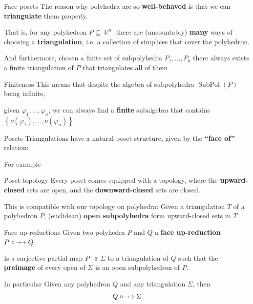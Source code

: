\documentclass{beamer}
\DeclareMathOperator{\Sub}{SubPol}
\DeclareMathOperator{\R}{\mathbb{R}}
\newcommand{\fupred}{
  \mathrel{\circ}~\kern-0.6em~\relbar\joinrel\mapsto
}
\newcommand{\set}[1]{\left\{#1\right\}}
\begin{document}
\begin{frame}{Face posets}
    The reason why polyhedra are so \textbf{well-behaved} is that we can 
    \textbf{triangulate} them properly.

    That is, for any polyhedron $P\subseteq \R^n$ there are (uncountably) \textbf{many} ways
    of choosing a \textbf{triangulation}, i.e. a collection of simplices 
    that cover the polyhedron.
    \vfill
\end{frame}
\begin{frame}
    And furthermore, chosen a finite set of subpolyhedra $P_1,...,P_k$ 
    there always exists a finite triangulation of $P$ that triangulates all of them 

    \vfill 
\end{frame}
\begin{frame}{Finiteness}
    This means that despite the algebra of subpolyhedra $\Sub(P)$ being infinite,

    given $\varphi_1,...,\varphi_n$, we can always find a \textbf{finite} subalgebra 
    that contains $\set{\nu(\varphi_1),...,\nu(\varphi_n)}$ 
\end{frame}
\begin{frame}{Posets}
    Triangulations have a natural poset structure, given by the \textbf{``face of''} relation:
    \vfill 
\end{frame}
\begin{frame}
    For example
    \vfill 
\end{frame}
\begin{frame}{Poset topology}
    Every poset comes equipped with a topology, where 
    the \textbf{upward-closed} sets are open, and the 
    \textbf{downward-closed} sets are closed.
    \vfill 
\end{frame}
\begin{frame}
    This is compatible with our topology on polyhedra: 
    Given a triangulation $T$ of a polyhedron $P$, (euclidean) 
    \textbf{open subpolyhedra} form upward-closed sets in $T$
    \vfill
\end{frame}
\begin{frame}{Face up-reductions}
    Given two polyhedra $P$ and $Q$ a \textbf{face up-reduction}
    $P\fupred Q$
    
    Is a surjective partial map $P\twoheadrightarrow \Sigma$ to a triangulation of $Q$
    such that the \textbf{preimage} of every open of $\Sigma$ is an 
    open subpolyhedron of $P$.
    \vfill 
\end{frame}
\begin{frame}{In particular}
    Given any polyhedron $Q$ and any triangulation $\Sigma$, then 
    \[Q\fupred \Sigma\]
    \vfill 
\end{frame}
\end{document}
